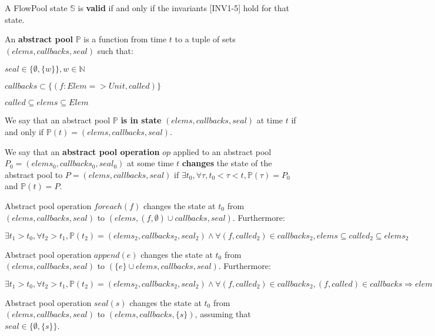 \documentclass[runningheads,a4paper]{llncs}
\begin{document}
\begin{definition}[Validity]
A FlowPool state $\mathbb{S}$ is \textbf{valid} if and only if the invariants [INV1-5] hold for that state.
\end{definition}


\begin{definition}
An \textbf{abstract pool} $\mathbb{P}$ is a function from time $t$ to a tuple of sets $(elems, callbacks, seal)$ such that:
\begin{description}
\item $seal \in \{ \emptyset, \{ w \} \}, w \in \mathbb{N}$
\item $callbacks \subset \{ (f: Elem => Unit, called) \}$
\item $called \subseteq elems \subseteq Elem$
\end{description}
We say that an abstract pool $\mathbb{P}$ \textbf{is in state} $(elems, callbacks, seal)$ at time $t$ if and only if $\mathbb{P}(t) = (elems, callbacks, seal)$.
\end{definition}


\begin{definition}
We say that an \textbf{abstract pool operation} $op$ applied to an abstract pool $P_0 = (elems_0, callbacks_0, seal_0)$ 
at some time $t$ \textbf{changes} the state of the abstract pool to $P = (elems, callbacks, seal)$ 
if $\exists t_0, \forall \tau, t_0 < \tau < t, \mathbb{P}(\tau) = P_0$ and $\mathbb{P}(t) = P$.

Abstract pool operation $foreach(f)$ changes the state at $t_0$ from $(elems, callbacks, seal)$ 
to $(elems, (f, \emptyset) \cup callbacks, seal)$. Furthermore:

$\exists t_1 > t_0, \forall t_2 > t_1, \mathbb{P}(t_2) = (elems_2,
callbacks_2, seal_2) \wedge \forall (f, called_2) \in callbacks_2,
elems \subseteq called_2 \subseteq elems_2$

Abstract pool operation $append(e)$ changes the state at $t_0$ from
$(elems, callbacks, seal)$ to $(\{e\} \cup elems, callbacks, seal)$. Furthermore:

$\exists t_1 > t_0, \forall t_2 > t_1, \mathbb{P}(t_2) = (elems_2,
callbacks_2, seal_2) \wedge \forall (f, called_2) \in callbacks_2,
(f, called) \in callbacks \Rightarrow elem \in called_2$

Abstract pool operation $seal(s)$ changes the state at $t_0$ from
$(elems, callbacks, seal)$ to $(elems, callbacks, \{s\})$, assuming
that $seal \in \{ \emptyset, \{s\} \}$.

\end{definition}
\end{document}
